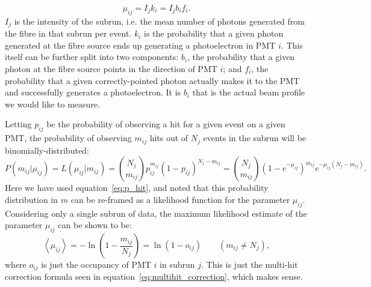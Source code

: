 \begin{equation}\label{eq:mu_def}
    \mu_{ij} = I_{j}k_{i} = I_{j}b_{i}f_{i}.
\end{equation}
$I_{j}$ is the intensity of the subrun, i.e. the mean number of photons generated from the fibre in that subrun per event. $k_{i}$ is the probability that a given photon generated at the fibre source ends up generating a photoelectron in PMT $i$. This itself can be further split into two components: $b_{i}$, the probability that a given photon at the fibre source points in the direction of PMT $i$; and $f_{i}$, the probability that a given correctly-pointed photon actually makes it to the PMT and successfully generates a photoelectron. It is $b_{i}$ that is the actual beam profile we would like to measure.

Letting $p_{ij}$ be the probability of observing a hit for a given event on a given PMT, the probability of observing $m_{ij}$ hits out of $N_{j}$ events in the subrun will be binomially-distributed:
\begin{equation}
    P(m_{ij}| \mu_{ij}) = L(\mu_{ij} | m_{ij}) = \binom{N_{j}}{m_{ij}}p_{ij}^{m_{ij}}(1-p_{ij})^{N_{j}-m_{ij}} = \binom{N_{j}}{m_{ij}}\left(1-e^{-\mu_{ij}}\right)^{m_{ij}}e^{-\mu_{ij}(N_{j}-m_{ij})}.
\end{equation}
Here we have used equation~\ref{eq:p_hit}, and noted that this probability distribution in $m$ can be re-framed as a likelihood function for the parameter $\mu_{ij}$. Considering only a single subrun of data, the maximum likelihood estimate of the parameter $\mu_{ij}$ can be shown to be:
\begin{equation}
    \left<\mu_{ij}\right> = -\ln\left(1-\frac{m_{ij}}{N_{j}}\right) = \ln\left(1-o_{ij}\right) \qquad(m_{ij} \neq N_{j}),
\end{equation}
where $o_{ij}$ is just the occupancy of PMT $i$ in subrun $j$. This is just the multi-hit correction formula seen in equation~\ref{eq:multihit_correction}, which makes sense.

